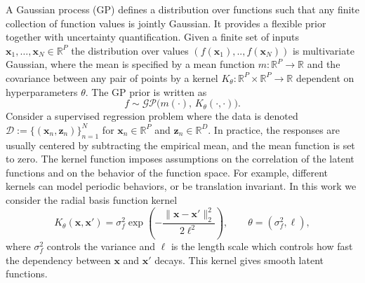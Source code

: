 A Gaussian process (GP) \citep{williams2006gaussian} defines a distribution over functions such that any finite collection of function values is jointly Gaussian. It provides a flexible prior together with uncertainty quantification. Given a finite set of inputs $\boldsymbol{x}_1,\ldots,\boldsymbol{x}_N\in\mathbb{R}^P$ the distribution over values $(f(\boldsymbol{x}_1), .., f(\boldsymbol{x}_N))$ is multivariate Gaussian, where the mean is specified by a mean function $m:\mathbb{R}^P\to\mathbb{R}$ and the covariance between any pair of points by a kernel $K_\theta:\mathbb{R}^P\times\mathbb{R}^P\to\mathbb{R}$ dependent on hyperparameters $\theta$. The GP prior is written  as 
\[
f \sim \mathcal{GP}\!\bigl(m(\cdot),\,K_{\theta}(\cdot,\cdot)\bigr).
\]
Consider a supervised regression problem where the data is denoted $\mathcal{D}:=\{(\boldsymbol{x}_n,\boldsymbol{z}_n)\}_{n=1}^N$ for $\boldsymbol{x}_n\in\mathbb{R}^P$ and $\boldsymbol{z}_n\in\mathbb{R}^D$. 
In practice, the responses are usually centered by subtracting the empirical mean, and the mean function is set to zero. 
The kernel function imposes assumptions on the correlation of the latent functions and on the behavior of the function space. For example, different kernels can model periodic behaviors, or be translation invariant. In this work we consider the radial basis function kernel
\[
K_{\theta}(\boldsymbol{x},\boldsymbol{x}')
=
\sigma_f^2\exp\!\left(-\frac{\|\boldsymbol{x}-\boldsymbol{x}'\|_2^2}{2\ell^2}\right),
\qquad
\theta=(\sigma_f^2,\ell),
\]
where $\sigma_f^2$ controls the variance and $\ell$ is the length scale which controls how fast the dependency between $\boldsymbol{x}$ and $\boldsymbol{x}'$ decays. This kernel gives smooth latent functions. 

